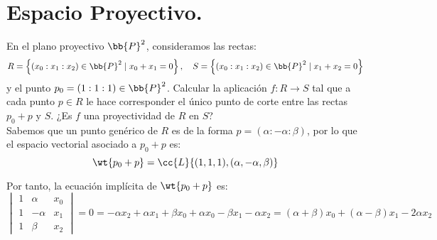 \section{Espacio Proyectivo.}\label{Rel:Tema4}


\begin{ejercicio}
    En el plano proyectivo $\bb{P}^2$, consideramos las rectas:
    \begin{equation*}
        R = \left\{ (x_0:x_1:x_2) \in \bb{P}^2 \mid x_0+x_1 = 0 \right\}, \quad S = \left\{ (x_0:x_1:x_2) \in \bb{P}^2 \mid x_1+x_2 = 0 \right\}
    \end{equation*}
    y el punto $p_0=(1:1:1)\in \bb{P}^2$. Calcular la aplicación $f:R \to S$ tal que a cada
    punto $p\in R$ le hace corresponder el único punto de corte entre
    las rectas $p_0+p$ y $S$. ¿Es $f$ una proyectividad de $R$ en $S$?\\

    Sabemos que un punto genérico de $R$ es de la forma $p=(\alpha:-\alpha:\beta)$, por lo que el
    espacio vectorial asociado a $p_0+p$ es:
    \begin{equation*}
        \wt{p_0+p} = \cc{L}\{(1,1,1), (\alpha, -\alpha, \beta)\}
    \end{equation*}

    Por tanto, la ecuación implícita de $\wt{p_0+p}$ es:
    \begin{equation*}
        \begin{vmatrix}
            1 & \alpha & x_0 \\
            1 & -\alpha & x_1 \\
            1 & \beta & x_2
        \end{vmatrix} = 0
        = -\alpha x_2 + \alpha x_1 + \beta x_0 + \alpha x_0 - \beta x_1 - \alpha x_2
        = (\alpha+\beta)x_0 + (\alpha-\beta)x_1 -2 \alpha x_2
    \end{equation*}


\end{ejercicio}
